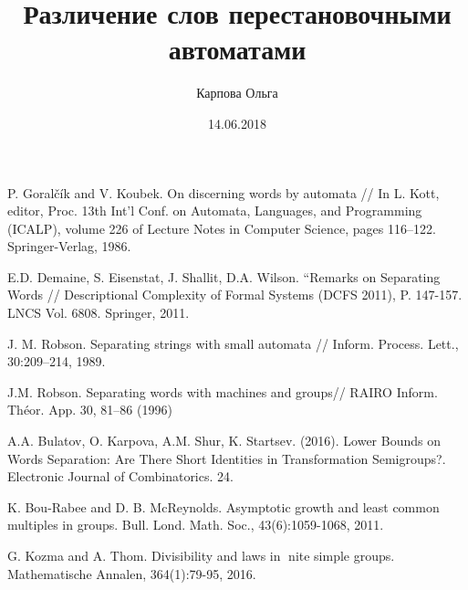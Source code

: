 \documentclass[14pt]{article}
\title{Различение слов перестановочными автоматами}
\date{14.06.2018}
\author{Карпова Ольга}
\theoremstyle{plain}
\theoremstyle{definition}
\begin{document}
		
	\tableofcontents
				
	\newpage
	\begin{thebibliography}{99}
		 P. Goralčík and V. Koubek. On discerning words by automata // In L. Kott, editor, Proc. 13th Int’l Conf. on Automata, Languages, and Programming (ICALP), volume 226 of Lecture Notes in Computer Science, pages 116–122. Springer-Verlag, 1986.
		
		 E.D. Demaine, S. Eisenstat, J. Shallit, D.A. Wilson. “Remarks on Separating Words // Descriptional Complexity of Formal Systems (DCFS 2011), P. 147-157. LNCS Vol. 6808. Springer, 2011.
		
		 J. M. Robson. Separating strings with small automata // Inform. Process. Lett.,
		30:209–214, 1989.
		
		 J.M. Robson. Separating words with machines and groups// RAIRO Inform. Théor. App. 30, 81–86 (1996)
		
		 A.A. Bulatov, O. Karpova, A.M. Shur, K. Startsev. (2016). Lower Bounds on Words Separation: Are There Short Identities in Transformation Semigroups?. Electronic Journal of Combinatorics. 24. 
		
		 K. Bou-Rabee and D. B. McReynolds. Asymptotic growth and least common multiples in groups. Bull. Lond. Math. Soc., 43(6):1059-1068, 2011.
			
		 G. Kozma and A. Thom. Divisibility and laws in nite simple groups. Mathematische
		Annalen, 364(1):79-95, 2016.
	\end{thebibliography}
\end{document}
